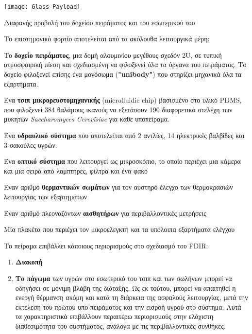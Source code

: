 \documentclass[a4paper,nobib]{tufte-book}
\begin{document}
\begin{marginfigure}
	\centering
	\texttt{[image: Glass\_Payload]}
	\caption{Διαφανής προβολή του δοχείου πειράματος και του εσωτερικού του}
	\label{fig:container}
\end{marginfigure}

Το επιστημονικό φορτίο αποτελείται από τα ακόλουθα λειτουργικά μέρη: \autocite{DDJF_PL}
\begin{compactitem}
	\item Το \textbf{δοχείο πειράματος}, μια δομή αλουμινίου μεγέθους σχεδόν 2U, σε τυπική ατμοσφαιρική πίεση και σχεδιασμένη να φιλοξενεί όλα τα όργανα του πειράματος. Το δοχείο φιλοξενεί επίσης ένα μονόσωμα (\textbf{"unibody"}) που στηρίζει μηχανικά όλα τα εξαρτήματα.
	\item Ένα \textbf{τσιπ μικρορευστομηχανικής} (microfluidic chip) βασισμένο στο υλικό \acs{PDMS}, που φιλοξενεί 384 θαλάμους ικανούς να εξετάσουν 190 διαφορετικά στελέχη των μυκητών \emph{Saccharomyces Cerevisiae} για κάθε υποπείραμα.
	\item Ένα \textbf{υδραυλικό σύστημα} που αποτελείται από 2 αντλίες, 14 ηλεκτρικές βαλβίδες και 3 σακούλες υγρών.
	\item Ένα \textbf{οπτικό σύστημα} που λειτουργεί ως μικροσκόπιο, το οποίο περιέχει μια κάμερα και μια σειρά από λαμπτήρες, φίλτρα και ένα φακό
	\item Έναν αριθμό \textbf{θερμαντικών σωμάτων} για τον αυστηρό έλεγχο των θερμοκρασιών λειτουργίας των εξαρτημάτων
	\item Έναν αριθμό πλεοναζόντων \textbf{αισθητήρων} για περιβαλλοντικές μετρήσεις
	\item Μία πλακέτα που περιέχει τον μικροελεγκτή και τα υπόλοιπα εξαρτήματα ελέγχου
\end{compactitem}



Το πείραμα επιβάλλει κάποιους περιορισμούς στο σχεδιασμό του \ac{FDIR}:
\label{sec:su_fdir}
\begin{enumerate}
	\item \textbf{Διακοπή} 
	\item \textbf{Το πάγωμα} των υγρών στο εσωτερικό του τσιπ και των σωλήνων μπορεί να οδηγήσει σε μόνιμη βλάβη της διάταξης. Ως εκ τούτου, μπορεί να απαιτηθεί η ενεργή θέρμανση ακόμη και κατά τη διάρκεια της ασφαλούς λειτουργίας, μετά την εκτέλεση του πρώτου υπο-πειράματος και την εισροή υγρού στο σύστημα. Αυτά τα χαρακτηριστικά επιβάλλουν περαιτέρω περιορισμούς στην ελάχιστη διαθεσιμότητα του συστήματος, ανάλογα με τις περιβαλλοντικές συνθήκες.
\end{enumerate}
\end{document}
